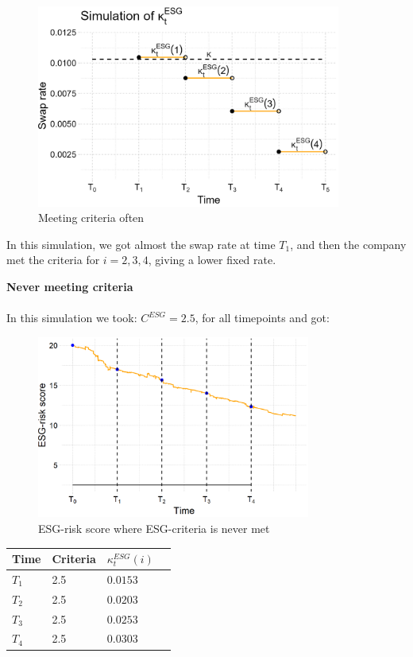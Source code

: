 \begin{figure}[htp]
    \centering
    \includegraphics[width= 10cm]{figures/ESG/kappa_t_ESG_2.png}
    \caption{Meeting criteria often}
    \label{fig: ESG_swap_2}
\end{figure}

In this simulation, we got almost the swap rate at time $T_{1}$, and then the company met the criteria for $i=2,3,4$, giving a lower fixed rate. 


\newpage
\textbf{Never meeting criteria}
\\~\\ 
In this simulation we took: $C^{ESG} = 2.5$, for all timepoints and got: 

\begin{figure}[htp]
    \centering
    \includegraphics[width=9cm]{figures/ESG/ESG_plt_criteria3.png}
    \caption{ESG-risk score where ESG-criteria is never met}
    \label{fig: ESG-risk_score_criteria3}
\end{figure}




\begin{center}
    \begin{tabular}{ | l | l | l | p{5cm} |}
    \hline
    Time    & Criteria  & $\kappa_{t}^{ESG}(i)$ \\ \hline
    $T_{1}$ &    2.5    & $0.0153$  \\ \hline
    $T_{2}$ &    2.5    & $0.0203$  \\ \hline
    $T_{3}$ &    2.5    & $0.0253$\\ \hline
    $T_{4}$ &    2.5    & $0.0303$ \\ \hline
    \end{tabular}
\end{center} 


